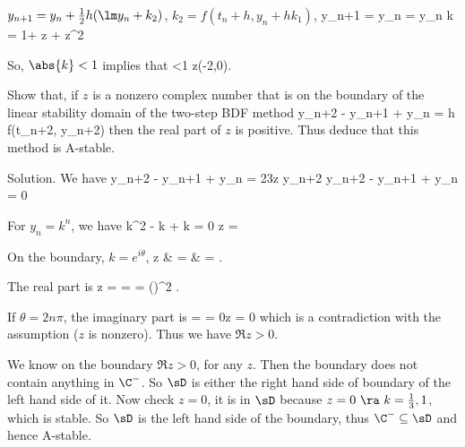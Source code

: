 \item [(v)] $y_{n+1}=y_n+ \frac 12h(\lm y_n +k_2)$, $k_2=f(t_{n}+h, y_{n}+hk_1)$,
\be
y_{n+1} = y_n  = y_n \quad\ra\quad k = 1+  z +  z^2
\ee

So, $\abs{k} <1$ implies that
\be
{} <1 \quad\ra\quad z\in(-2,0).
\ee
\een 



\item Show that, if $z$ is a nonzero complex number that is on the boundary of the linear stability domain of the two-step BDF method
\be
y_{n+2} -  y_{n+1} +  y_n =  h f(t_{n+2}, y_{n+2})
\ee
then the real part of $z$ is positive. Thus deduce that this method is A-stable.



Solution. We have
\be
y_{n+2} -  y_{n+1} +  y_n = \frac 23z y_{n+2} \quad\ra\quad y_{n+2} -  y_{n+1} +  y_n = 0
\ee

For $y_n = k^n$, we have
\be
k^2  -  k +  k = 0 \quad\ra\quad z =  
\ee

On the boundary, $k= e^{i\theta}$,
\beast
z & = &   =  .
\eeast

The real part is 
\be
\Re z =   =   = (\cos{})^2 .
\ee

If $\theta = 2n\pi$, the imaginary part is
\be
\Im =   = 0\quad\ra\quad z = 0
\ee
which is a contradiction with the assumption ($z$ is nonzero). Thus we have $\Re z >0$.

We know on the boundary $\Re z>0$, for any $z$. Then the boundary does not contain anything in $\C^-$. So $\sD$ is either the right hand side of boundary of the left hand side of it. Now check $z=0$, it is in $\sD$ because $z=0\ \ra\ k=\frac 13,1$, which is stable. So $\sD$ is the left hand side of the boundary, thus $\C^-\subseteq \sD$ and hence A-stable.




